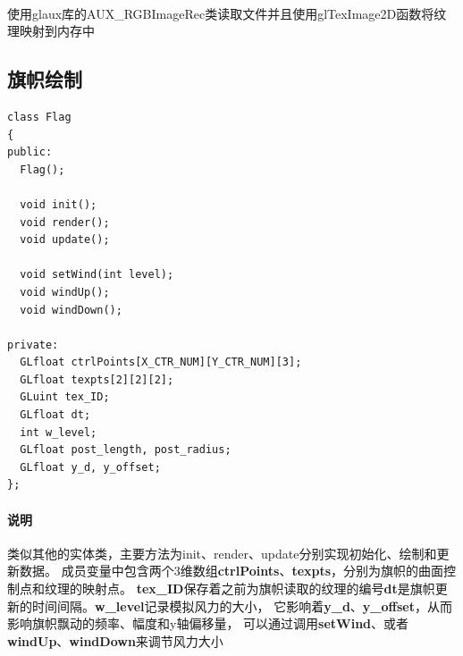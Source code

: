 \documentclass{article}
\begin{document}
            \paragraph{}
            使用glaux库的AUX\_RGBImageRec类读取文件并且使用glTexImage2D函数将纹理映射到内存中
        \subsection{旗帜绘制}
            \begin{lstlisting}[language={[ANSI]C}]
class Flag
{
public:
  Flag();

  void init();
  void render();
  void update();
	
  void setWind(int level);
  void windUp();
  void windDown();

private:
  GLfloat ctrlPoints[X_CTR_NUM][Y_CTR_NUM][3];
  GLfloat texpts[2][2][2];
  GLuint tex_ID;
  GLfloat dt;
  int w_level;
  GLfloat post_length, post_radius;
  GLfloat y_d, y_offset;
};
            \end{lstlisting}
            \paragraph{说明}
            类似其他的实体类，主要方法为init、render、update分别实现初始化、绘制和更新数据。
            成员变量中包含两个3维数组\textbf{ctrlPoints}、\textbf{texpts}，分别为旗帜的曲面控制点和纹理的映射点。
            \textbf{tex\_ID}保存着之前为旗帜读取的纹理的编号\textbf{dt}是旗帜更新的时间间隔。\textbf{w\_level}记录模拟风力的大小，
            它影响着\textbf{y\_d}、\textbf{y\_offset}，从而影响旗帜飘动的频率、幅度和y轴偏移量，
            可以通过调用\textbf{setWind}、或者\textbf{windUp}、\textbf{windDown}来调节风力大小
\end{document}
